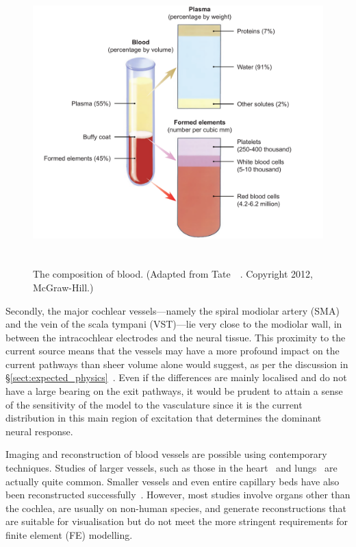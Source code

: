 \begin{figure}[t]
	\centering
	\includegraphics[height=11cm]{Simulations/Vasculature/bloodcomp}
	\caption[The composition of blood]{The composition of blood. (Adapted from
	Tate~\etal~\cite{tate2012}. Copyright \textcopyright{} 2012, McGraw-Hill.)}
	\label{fig:bloodcomp}
\end{figure}

Secondly, the major cochlear vessels---namely the spiral modiolar artery (SMA)
and the vein of the scala tympani (VST)---lie very close to the modiolar wall,
in between the intracochlear electrodes and the neural tissue. This proximity to
the current source means that the vessels may have a more profound impact on the
current pathways than sheer volume alone would suggest, as per the discussion in
\S\ref{sect:expected_physics}~\cite{baker1989}. Even if the differences are
mainly localised and do not have a large bearing on the exit pathways, it would
be prudent to attain a sense of the sensitivity of the model to the vasculature
since it is the current distribution in this main region of excitation that
determines the dominant neural response.


Imaging and reconstruction of blood vessels are possible using contemporary
techniques. Studies of larger vessels, such as those in the
heart~\cite{bishop2010} and lungs~\cite{johnson1998} are actually quite common.
Smaller vessels and even entire capillary beds have also been reconstructed
successfully~\cite{ross1995,muller2006blood,mondy2009thesis,wagner2011}.
However, most studies involve organs other than the cochlea, are usually on
non-human species, and generate reconstructions that are suitable for
visualisation but do not meet the more stringent requirements for finite element
(FE) modelling.

